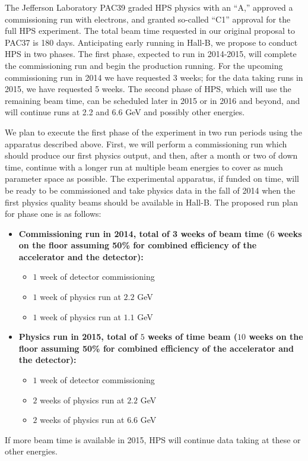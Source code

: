 The Jefferson Laboratory PAC39 graded HPS physics with an ``A,'' approved a commissioning run with electrons, and granted so-called ``C1'' approval 
for the full HPS experiment. The total beam time requested in our original proposal to PAC37 is 180 days.
Anticipating early running in Hall-B, we propose to conduct HPS in two phases. The first phase, expected to run 
in 2014-2015, will complete the commissioning run and begin the production running. For the upcoming commissioning run in 2014 
we have requested 3 weeks; for the data taking runs in
2015, we have requested 5 weeks. The second phase of HPS, which will use the remaining beam time, can be scheduled later in 2015 
or in 2016 and beyond, and will continue runs at 2.2 and 6.6 GeV and possibly other energies.

We plan to execute the first phase of the experiment in two run periods using the apparatus described above. First, we will perform 
a commissioning run which should produce our first physics output, and then, after a month or two of down time, continue with a longer 
run at multiple beam 
energies to cover as much parameter space as possible. The experimental apparatus, if funded on time, will be ready to be commissioned 
and take physics data in the fall of 2014 when the first physics quality beams should be available in Hall-B. The proposed run plan for phase
one is as follows: 

\begin{itemize}
\item {\bf Commissioning run in 2014, total of 3 weeks of beam time ($6$ weeks on the floor assuming 50\% for combined efficiency of 
the accelerator and the detector):}
\begin{itemize}
\item $1$ week of detector commissioning
\item $1$ week of physics run at $2.2$ GeV
\item $1$ week of physics run at $1.1$ GeV
\end{itemize}
\item{\bf Physics run in 2015, total of $5$ weeks of time beam ($10$ weeks on the floor assuming 50\% for combined efficiency of the 
accelerator and the detector):}
\begin{itemize}
\item $1$ week of detector commissioning
\item $2$ weeks of physics run at $2.2$ GeV
\item $2$ weeks of physics run at $6.6$ GeV
\end{itemize}
\end{itemize}
If more beam time is available in 2015, HPS will continue data taking at these or other energies.

